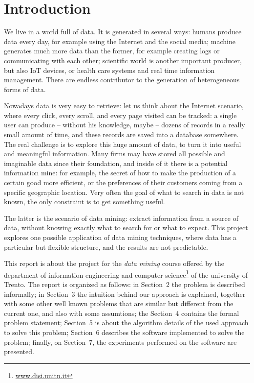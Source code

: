 \documentclass{acm_proc_article-sp-sigmod09}
\begin{document}


\section{Introduction}
We live in a world full of data. It is generated in several ways: humans produce data every day, for example using the Internet and the social media; machine generates much more data than the former, for example creating logs or communicating with each other; scientific world is another important producer, but also IoT devices, or health care systems and real time information management. There are endless contributor to the generation of heterogeneous forms of data.

Nowadays data is very easy to retrieve: let us think about the Internet scenario, where every click, every scroll, and every page visited can be tracked: a single user can produce -- without his knowledge, maybe -- dozens of records in a really small amount of time, and these records are saved into a database somewhere. The real challenge is to explore this huge amount of data, to turn it into useful and meaningful information. Many firms may have stored all possible and imaginable data since their foundation, and inside of it there is a potential information mine: for example, the secret of how to make the production of a certain good more efficient, or the preferences of their customers coming from a specific geographic location. Very often the goal of what to search in data is not known, the only constraint is to get something useful.

The latter is the scenario of data mining: extract information from a source of data, without knowing exactly what to search for or what to expect. This project explores one possible application of data mining techniques, where data has a particular but flexible structure, and the results are not predictable.

This report is about the project for the \emph{data mining} course offered by the department of information engineering and computer science\footnote{\url{www.disi.unitn.it}} of the university of Trento. The report is organized as follows: in Section~2 the problem is described informally; in Section~3 the intuition behind our approach is explained, together with some other well known problems that are similar but different from the current one, and also with some assumtions; the Section~4 contains the formal problem statement; Section~5 is about the algorithm details of the used approach to solve this problem; Section~6 describes the software implemented to solve the problem; finally, on Section~7, the experiments performed on the software are presented.
\end{document}
